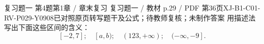 \par\noindent\begin{minipage}{\linewidth}
\begin{bankitem}{复习题一 第4题}{第1章 / 章末复习 复习题一 / 教材 p.29 / PDF 第36页}{XJ-B1-C01-RV-P029-Y0908}{已对照原页转写题干及公式；待教师复核；未制作答案}
用描述法写出下面这些区间的含义：
\[[-2,7];\quad [a,b);\quad (123,+\infty);\quad (-\infty,-9].\]
\end{bankitem}
\end{minipage}\par\medskip
